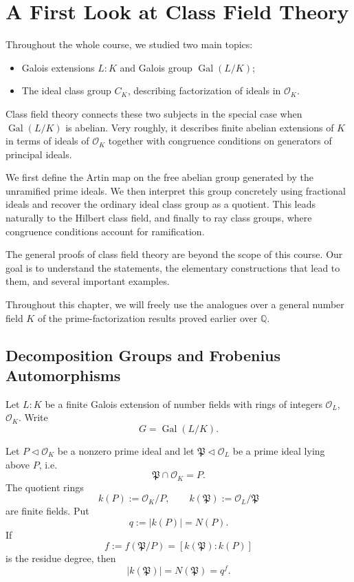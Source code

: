 \chapter{A First Look at Class Field Theory}

Throughout the whole course, we studied two main topics:
\begin{itemize}
    \item Galois extensions $L:K$ and Galois group $\operatorname{Gal}(L/K)$;
    \item The ideal class group $C_K$, describing factorization of ideals in $\mathcal O_K$.
\end{itemize}
Class field theory connects these two subjects in the special case when $\operatorname{Gal}(L/K)$ is abelian. Very roughly, it describes finite abelian
extensions of $K$ in terms of ideals of $\mathcal O_K$ together with congruence conditions on generators of principal ideals.

We first define the Artin map on the free abelian group generated by the unramified prime ideals. We then interpret this group concretely using fractional ideals and recover the
ordinary ideal class group as a quotient. This leads naturally to the Hilbert class field, and
finally to ray class groups, where congruence conditions account for ramification.

The general proofs of class field theory are beyond the scope of this course. Our goal is to
understand the statements, the elementary constructions that lead to them, and several
important examples. 

Throughout this chapter, we will freely use the analogues over a general number field $K$ of the
prime-factorization results proved earlier over $\mathbb Q$.

\section{Decomposition Groups and Frobenius Automorphisms}

Let $L:K$ be a finite Galois extension of number fields with rings of integers $\mathcal O_L$, $\mathcal O_K$. Write
\[
G=\operatorname{Gal}(L/K).
\]

Let $P \lhd \mathcal O_K$ be a nonzero prime ideal and let $\mathfrak P\lhd \mathcal O_L$
be a prime ideal lying above $P$, i.e.
\[
\mathfrak P\cap \mathcal O_K=P.
\]
The quotient rings
\[
k(P):=\mathcal O_K/P, \qquad k(\mathfrak P):=\mathcal O_L/\mathfrak P
\]
are finite fields. Put
\[
q:=|k(P)|=N(P).
\]
If
\[
f:=f(\mathfrak P/P)=[k(\mathfrak P):k(P)]
\]
is the residue degree, then
\[
|k(\mathfrak P)|=N(\mathfrak P)=q^f.
\]

